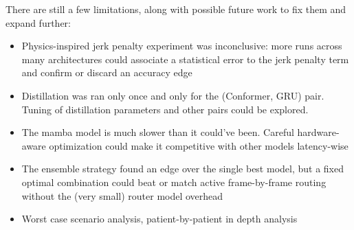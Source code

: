 \documentclass[
reprint,
aps,
prd,
superscriptaddress,
nofootinbib
]{revtex4-2}
\begin{document}
There are still a few limitations, along with possible future work to fix them and expand further:
\begin{itemize}
    \item Physics-inspired jerk penalty experiment was inconclusive: more runs across many architectures could associate a statistical error to the jerk penalty term and confirm or discard an accuracy edge
    \item Distillation was ran only once and only for the (Conformer, GRU) pair. Tuning of distillation parameters and other pairs could be explored.
    \item The mamba model is much slower than it could've been. Careful hardware-aware optimization could make it competitive with other models latency-wise
    \item The ensemble strategy found an edge over the single best model, but a fixed optimal combination could beat or match active frame-by-frame routing without the (very small) router model overhead
    \item Worst case scenario analysis, patient-by-patient in depth analysis
\end{itemize}







\end{document}
